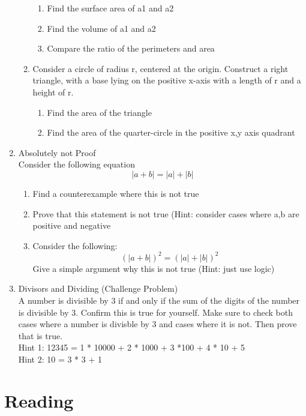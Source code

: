 \documentclass{article}
\begin{document}
\begin{enumerate}
\begin{enumerate}
\begin{enumerate}
            \item Find the surface area of a1 and a2
            \item Find the volume of a1 and a2
            \item Compare the ratio of the perimeters and area
        \end{enumerate}
        \item Consider a circle of radius r, centered at the origin. Construct a right triangle, with a base lying on the positive x-axis with a length of r and a height of r. 
        \begin{enumerate}
            \item Find the area of the triangle
            \item Find the area of the quarter-circle in the positive x,y axis quadrant
        \end{enumerate}
     \end{enumerate}
     
     \item Absolutely not Proof\\
     		Consider the following equation
            \[|a+b| = |a| + |b| \]
            \begin{enumerate}
            	\item Find a counterexample where this is not true
                \item Prove that this statement is not true (Hint: consider cases where a,b are positive and negative
                \item Consider the following: 
                	\[(|a+b|)^2 = (|a| + |b|)^2 \]
                    Give a simple argument why this is not true (Hint: just use logic)
             \end{enumerate}
        
     \item Divisors and Dividing (Challenge Problem)\\
     A number is divisible by 3 if and only if the sum of the digits of the number is divisible by 3. Confirm this is true for yourself. Make sure to check both cases where a number is divisble by 3 and cases where it is not. Then prove that is true.\\
     Hint 1: 12345 = 1 * 10000 + 2 * 1000 + 3 *100 + 4 * 10 + 5\\
     Hint 2: 10 = 3 * 3 + 1

\end{enumerate}


\section{Reading}
\label{sec:Reading}
\end{document}
